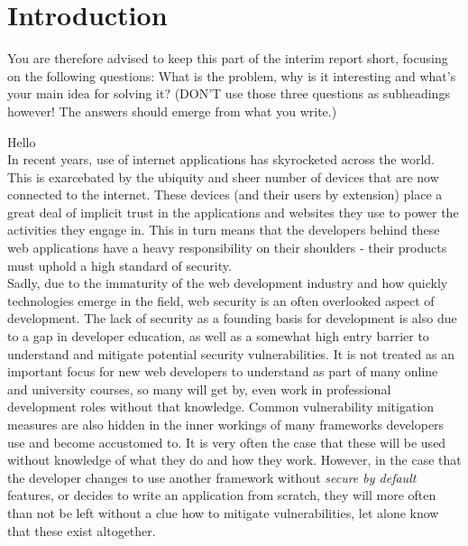 \chapter{Introduction}

  You are therefore advised to keep this part of the interim report short, focusing on the following questions: What is the problem, why is it interesting and what’s your main idea for solving it?  (DON'T use those three questions as subheadings however!  The answers should emerge from what you write.)

Hello \cite{greenwade93} \\


In recent years, use of internet applications has skyrocketed across the world. This is exarcebated by the ubiquity and sheer number of devices that are now connected to the internet. 
These devices (and their users by extension) place a great deal of implicit trust in the applications and websites they use to power the activities they engage in. 
This in turn means that the developers behind these web applications have a heavy responsibility on their shoulders - their products must uphold a high standard of security.  \\


Sadly, due to the immaturity of the web development industry and how quickly technologies emerge in the field, web security is an often overlooked aspect of development. 
The lack of security as a founding basis for development is also due to a gap in developer education, as well as a somewhat high entry barrier to understand and mitigate potential security vulnerabilities. It is not treated as an important focus for new web developers to understand as part of many online and university courses, so many will get by, even work in professional development roles without that knowledge. 
Common vulnerability mitigation measures are also hidden in the inner workings of many frameworks developers use and become accustomed to. 
It is very often the case that these will be used without knowledge of what they do and how they work. However, in the case that the developer changes to use another framework without \textit{secure by default} features, or decides to write an application from scratch, they will more often than not be left without a clue how to mitigate vulnerabilities, let alone know that these exist altogether. \\



